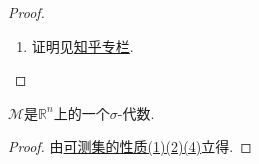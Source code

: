 \documentclass[../../main.tex]{subfiles}
\begin{document}
\begin{proof}
\begin{enumerate}[(1)]
\item 证明见\href{https://zhuanlan.zhihu.com/p/365546947#:~:text=%E5%AE%9A%E7%90%864.1%20%EF%BC%88%E5%8F%AF%E6%B5%8B%E9%9B%86%E7%9A%84%E7%9B%B4%E7%A7%AF%E4%BB%8D%E7%84%B6%E5%8F%AF%E6%B5%8B%EF%BC%8C%E5%B9%B6%E4%B8%94%E7%9B%B4%E7%A7%AF%E7%9A%84%E6%B5%8B%E5%BA%A6%E4%B8%BA%E6%B5%8B%E5%BA%A6%E7%9A%84%E4%B9%98%E7%A7%AF%EF%BC%89%20%E5%A6%82%E6%9E%9C%20A%20%E5%92%8C%20B%20%E5%88%86%E5%88%AB%E4%B8%BA%20p,%28A%29%20cdot%20m%20%28B%29%5C%20%E8%AF%81%E6%98%8E%E6%8C%89%E7%85%A7%E4%BB%A5%E4%B8%8B%E7%89%B9%E6%AE%8A%E5%88%B0%E4%B8%80%E8%88%AC%E7%9A%84%E8%BF%87%E7%A8%8B%E3%80%82%20%E6%96%B9%E4%BD%93%EF%BC%9A%E6%96%B9%E4%BD%93%E7%9A%84%E7%9B%B4%E7%A7%AF%E4%BB%8D%E7%84%B6%E6%98%AF%E6%96%B9%E4%BD%93%EF%BC%8C%E6%89%80%E4%BB%A5%E5%8F%AF%E6%B5%8B%E3%80%82%20%E5%85%B6%E6%B5%8B%E5%BA%A6%E5%B0%B1%E6%98%AF%E5%8E%9F%E6%9D%A5%E4%B8%A4%E4%B8%AA%E6%96%B9%E4%BD%93%E7%9A%84%E4%B9%98%E7%A7%AF%E3%80%82%20%E6%A0%B9%E6%8D%AE%E6%B5%8B%E5%BA%A6%E7%9A%84%E5%8F%AF%E5%8A%A0%E6%80%A7%E5%BE%97%E5%88%B0%E7%9B%B4%E7%A7%AF%E7%9A%84%E6%B5%8B%E5%BA%A6%E7%AD%89%E4%BA%8E%E6%B5%8B%E5%BA%A6%E7%9A%84%E4%B9%98%E7%A7%AF%E3%80%82}{知乎专栏}.
\end{enumerate} 
\end{proof}

\begin{corollary}\label{corollary:可测集类是sigma-代数}
$\mathscr{M}$是$\mathbb{R}^n$上的一个$\sigma$-代数.
\end{corollary}
\begin{proof}
由\hyperref[theorem:可测集的性质]{可测集的性质(1)(2)(4)}立得.
\end{proof}
\end{document}
